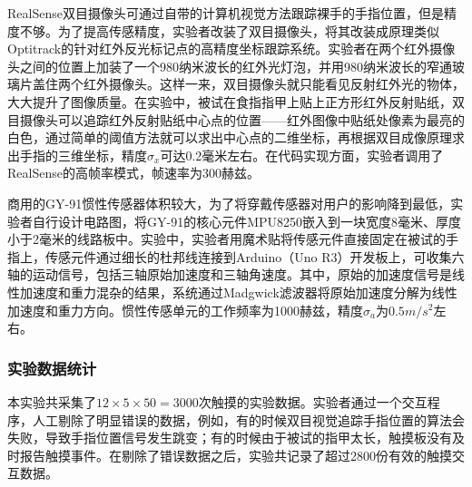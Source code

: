 RealSense双目摄像头可通过自带的计算机视觉方法跟踪裸手的手指位置，但是精度不够。为了提高传感精度，实验者改装了双目摄像头，将其改装成原理类似Optitrack\cite{point2011optitrack}的针对红外反光标记点的高精度坐标跟踪系统。实验者在两个红外摄像头之间的位置上加装了一个980纳米波长的红外光灯泡，并用980纳米波长的窄通玻璃片盖住两个红外摄像头。这样一来，双目摄像头就只能看见反射红外光的物体，大大提升了图像质量。在实验中，被试在食指指甲上贴上正方形红外反射贴纸，双目摄像头可以追踪红外反射贴纸中心点的位置——红外图像中贴纸处像素为最亮的白色，通过简单的阈值方法就可以求出中心点的二维坐标，再根据双目成像原理求出手指的三维坐标，精度$\sigma_x$可达0.2毫米左右。在代码实现方面，实验者调用了RealSense的高帧率模式，帧速率为300赫兹。

商用的GY-91惯性传感器体积较大，为了将穿戴传感器对用户的影响降到最低，实验者自行设计电路图，将GY-91的核心元件MPU8250嵌入到一块宽度8毫米、厚度小于2毫米的线路板中。实验中，实验者用魔术贴将传感元件直接固定在被试的手指上，传感元件通过细长的杜邦线连接到Arduino（Uno R3）开发板上，可收集六轴的运动信号，包括三轴原始加速度和三轴角速度。其中，原始的加速度信号是线性加速度和重力混杂的结果，系统通过Madgwick滤波器\cite{madgwick2010efficient}将原始加速度分解为线性加速度和重力方向。惯性传感单元的工作频率为1000赫兹，精度$\sigma_a$为$0.5m/s^2$左右。

\subsubsection{实验数据统计}\label{section:fitting_result}

本实验共采集了$12\times5\times50=3000$次触摸的实验数据。实验者通过一个交互程序，人工剔除了明显错误的数据，例如，有的时候双目视觉追踪手指位置的算法会失败，导致手指位置信号发生跳变；有的时候由于被试的指甲太长，触摸板没有及时报告触摸事件。在剔除了错误数据之后，实验共记录了超过2800份有效的触摸交互数据。

